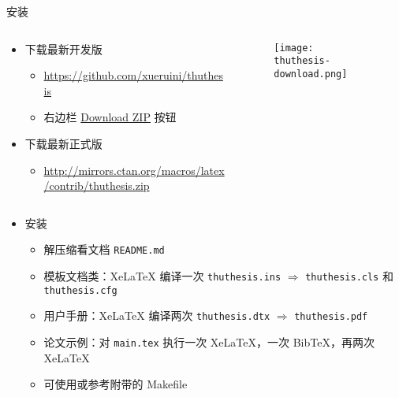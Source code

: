 \begin{frame}{安装\ThuThesis}
      \begin{columns}
        \begin{column}{.7\textwidth}
  \begin{itemize}
    \item 下载最新开发版
      \begin{itemize}
        \item \url{https://github.com/xueruini/thuthesis}
        \item 右边栏
          \href{https://github.com/xueruini/thuthesis/archive/master.zip}%
          {Download ZIP} 按钮
      \end{itemize}
    \item 下载最新正式版
      \begin{itemize}
        \item \url{http://mirrors.ctan.org/macros/latex/contrib/thuthesis.zip}
      \end{itemize}
  \end{itemize}
        \end{column}
        \begin{column}{.3\textwidth}
          \begin{figure}[htbp]
            \centering
            \texttt{[image: thuthesis-download.png]}
          \end{figure}
        \end{column}
      \end{columns}
  \begin{itemize}
    \item 安装
      \begin{itemize}
        \item 解压缩看文档 \texttt{README.md}
        \item 模板文档类：XeLaTeX 编译一次 \texttt{thuthesis.ins} $\Rightarrow$
          \texttt{thuthesis.cls} 和 \texttt{thuthesis.cfg}
		\item 用户手册：XeLaTeX 编译两次 \texttt{thuthesis.dtx} $\Rightarrow$
          \texttt{thuthesis.pdf}
        \item 论文示例：对 \texttt{main.tex} 执行一次 XeLaTeX，一次 BibTeX，再两次
          XeLaTeX
        \item 可使用或参考附带的 Makefile
      \end{itemize}
  \end{itemize}
\end{frame}

